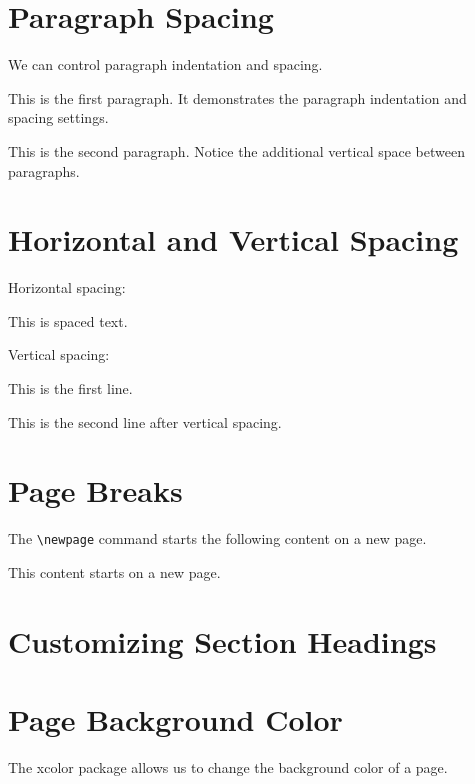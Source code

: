 \documentclass[12pt,a4paper]{article}
\begin{document}
\section{Paragraph Spacing}

We can control paragraph indentation and spacing.

\setlength{\parindent}{2em}
\setlength{\parskip}{1em}

This is the first paragraph. It demonstrates
the paragraph indentation and spacing settings.

This is the second paragraph. Notice the
additional vertical space between paragraphs.

\section{Horizontal and Vertical Spacing}

Horizontal spacing:

This is \hspace{1cm} spaced text.

Vertical spacing:

This is the first line.

\vspace{0.5cm}

This is the second line after vertical spacing.

\section{Page Breaks}

The \texttt{\textbackslash newpage} command
starts the following content on a new page.

\newpage

This content starts on a new page.


\section{Customizing Section Headings}

\sectionfont{\Large\bfseries\color{blue}}
\subsectionfont{\itshape\color{red}}

\section{Page Background Color}

The xcolor package allows us to change
the background color of a page.
\end{document}
